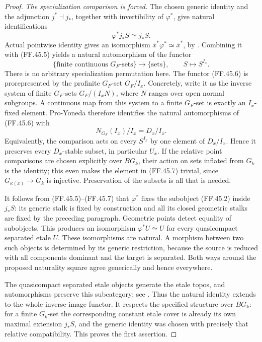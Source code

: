\begin{proof}
\emph{The specialization comparison is forced.}
The chosen generic identity and the adjunction
\(j^*\dashv j_*\), together with invertibility of
\(\varphi^*\), give natural identifications
\[
                             \varphi^*j_*S\simeq j_*S.
                                                        \tag{FF.45.5}
\]
Actual pointwise identity gives an isomorphism
\(\bar x^*\varphi^*\simeq\bar x^*\), by
\citet[Proposition~3.6]{FF_CHW2024}. Combining it with
(FF.45.5) yields a natural automorphism of the functor
\[
       \{\text{finite continuous }G_F\text{-sets}\}
          \longrightarrow\{\text{sets}\},\qquad
                            S\longmapsto S^{I_x}.
                                                        \tag{FF.45.6}
\]
There is no arbitrary specialization permutation here.
The functor (FF.45.6) is prorepresented by the profinite
\(G_F\)-set \(G_F/I_x\). Concretely, write it as the
inverse system of finite \(G_F\)-sets
\(G_F/(I_xN)\), where \(N\) ranges over open normal
subgroups. A continuous map from this system to a finite
\(G_F\)-set is exactly an \(I_x\)-fixed element.
Pro-Yoneda therefore identifies the natural automorphisms
of (FF.45.6) with
\[
                      N_{G_F}(I_x)/I_x=D_x/I_x.
                                                        \tag{FF.45.7}
\]
Equivalently, the comparison acts on every \(S^{I_x}\)
by one element of \(D_x/I_x\). Hence it preserves
every \(D_x\)-stable subset, in particular
\(U_{\bar x}\). If the relative point comparisons are
chosen explicitly over \(BG_k\), their action on sets
inflated from \(G_k\) is the identity; this even makes
the element in (FF.45.7) trivial, since
\(G_{\kappa(x)}\to G_k\) is injective. Preservation of
the subsets is all that is needed.

It follows from (FF.45.5)--(FF.45.7) that \(\varphi^*\)
fixes the subobject (FF.45.2) inside \(j_*S\): its
generic stalk is fixed by construction and all its closed
geometric stalks are fixed by the preceding paragraph.
Geometric points detect equality of subobjects. This
produces an isomorphism \(\varphi^*U\simeq U\) for
every quasicompact separated etale \(U\). These
isomorphisms are natural. A morphism between two such
objects is determined by its generic restriction, because
the source is reduced with all components dominant and
the target is separated. Both ways around the proposed
naturality square agree generically and hence everywhere.

The quasicompact separated etale objects generate the
etale topos, and automorphisms preserve this subcategory;
see \citet[Theorem~A.8, Corollaries~A.9 and~A.11]
{FF_CHW2024}. Thus the natural identity extends to the
whole inverse-image functor. It respects the specified
structure over \(BG_k\): for a finite \(G_k\)-set the
corresponding constant etale cover is already its own
maximal extension \(j_*S\), and the generic identity
was chosen with precisely that relative compatibility.
This proves the first assertion.


\end{proof}
